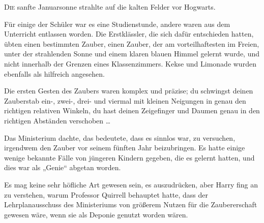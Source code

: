 
\lettrine{D}{ie} sanfte Januarsonne strahlte auf die kalten Felder vor Hogwarts.

Für einige der Schüler war es eine Studienstunde, andere waren aus dem Unterricht entlassen worden. Die Erstklässler, die sich dafür entschieden hatten, übten einen bestimmten Zauber, einen Zauber, der am vorteilhaftesten im Freien, unter der strahlenden Sonne und einem klaren blauen Himmel gelernt wurde, und nicht innerhalb der Grenzen eines Klassenzimmers. Kekse und Limonade wurden ebenfalls als hilfreich angesehen.

Die ersten Gesten des Zaubers waren komplex und präzise; du schwingst deinen Zauberstab ein-, zwei-, drei- und viermal mit kleinen Neigungen in genau den richtigen relativen Winkeln, du hast deinen Zeigefinger und Daumen genau in den richtigen Abständen verschoben …

Das Ministerium dachte, das bedeutete, dass es sinnlos war, zu versuchen, irgendwem den Zauber vor seinem fünften Jahr beizubringen. Es hatte einige wenige bekannte Fälle von jüngeren Kindern gegeben, die es gelernt hatten, und dies war als
„Genie“ abgetan worden.

Es mag keine sehr höfliche Art gewesen sein, es auszudrücken, aber Harry fing an zu verstehen, warum Professor Quirrell behauptet hatte, dass der Lehrplanausschuss des Ministeriums von größerem Nutzen für die Zaubererschaft gewesen wäre, wenn sie als Deponie genutzt worden wären.

